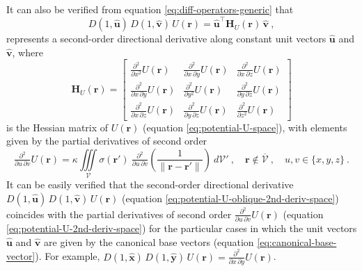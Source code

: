 It can also be verified from equation \ref{eq:diff-operators-generic} that 
\begin{equation}
	D(1, \hat{\mathbf{u}}) \, D(1, \hat{\mathbf{v}}) \, U(\mathbf{r}) = 
	\hat{\mathbf{u}}^{\top} \mathbf{H}_{U}(\mathbf{r}) \, \hat{\mathbf{v}} \: ,
	\label{eq:potential-U-oblique-2nd-deriv-space}
\end{equation}
represents a second-order directional derivative along constant unit vectors $\hat{\mathbf{u}}$ and
$\hat{\mathbf{v}}$, where 
\begin{equation}
	\mathbf{H}_{U}(\mathbf{r}) = 
	\begin{bmatrix}
		\tfrac{\partial^{2}}{\partial x^{2}} U(\mathbf{r}) & 
		\tfrac{\partial^{2}}{\partial x \, \partial y} U(\mathbf{r}) & 
		\tfrac{\partial^{2}}{\partial x \, \partial z} U(\mathbf{r}) \\
		\tfrac{\partial^{2}}{\partial x \, \partial y} U(\mathbf{r}) & 
		\tfrac{\partial^{2}}{\partial y^{2}} U(\mathbf{r}) & 
		\tfrac{\partial^{2}}{\partial y \, \partial z} U(\mathbf{r}) \\
		\tfrac{\partial^{2}}{\partial x \, \partial z} U(\mathbf{r}) & 
		\tfrac{\partial^{2}}{\partial y \, \partial z} U(\mathbf{r}) & 
		\tfrac{\partial^{2}}{\partial z^{2}} U(\mathbf{r})
	\end{bmatrix}
	\label{eq:potential-U-Hessian}
\end{equation}
is the Hessian matrix \citep[e.g.,][ p. 158]{kaplan2002} of $U(\mathbf{r})$ (equation \ref{eq:potential-U-space}),
with elements given by the partial derivatives of second order
\begin{equation}
	\tfrac{\partial^{2}}{\partial u \, \partial v} U(\mathbf{r}) = \kappa \iiint\limits_{\mathcal{V}}
	\sigma(\mathbf{r}') \: 
	\tfrac{\partial^{2}}{\partial u \, \partial v} \left( \frac{1}{\| \mathbf{r} - \mathbf{r}'\|} \right)
	\: d\mathcal{V}' \: , \quad \mathbf{r} \notin \overline{\mathcal{V}} \: , \quad u, v \in \{ x, y, z \} \: .
	\label{eq:potential-U-2nd-deriv-space}
\end{equation} 
It can be easily verified that 
the second-order directional derivative $D(1, \hat{\mathbf{u}}) \, D(1, \hat{\mathbf{v}}) \, U(\mathbf{r})$ 
(equation \ref{eq:potential-U-oblique-2nd-deriv-space})
coincides with the partial derivatives of second order $\tfrac{\partial^{2}}{\partial u \, \partial v} U(\mathbf{r})$ 
(equation \ref{eq:potential-U-2nd-deriv-space}) for the particular cases in which the unit vectors 
$\hat{\mathbf{u}}$ and $\hat{\mathbf{v}}$ are given by the canonical base vectors (equation \ref{eq:canonical-base-vector}).
For example, $D(1, \hat{\mathbf{x}}) \, D(1, \hat{\mathbf{y}}) \, U(\mathbf{r}) = \tfrac{\partial^{2}}{\partial x \, \partial y} U(\mathbf{r})$.

